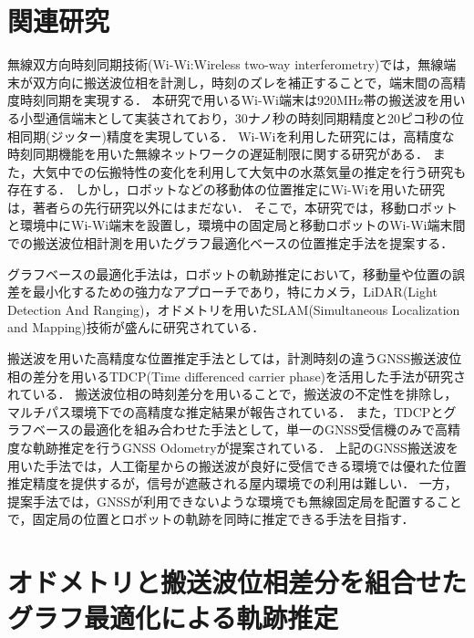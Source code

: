 \documentclass[a4jsme]{jsmepaper}
\begin{document}
\section{関連研究}
無線双方向時刻同期技術(Wi-Wi:Wireless two-way interferometry)では，無線端末が双方向に搬送波位相を計測し，時刻のズレを補正することで，端末間の高精度時刻同期を実現する．
本研究で用いるWi-Wi端末は920MHz帯の搬送波を用いる小型通信端末として実装されており，30ナノ秒の時刻同期精度と20ピコ秒の位相同期(ジッター)精度を実現している\cite{ouchi2024evaluation}．
Wi-Wiを利用した研究には，高精度な時刻同期機能を用いた無線ネットワークの遅延制限に関する研究\cite{Yamasaki2021}がある．
また，大気中での伝搬特性の変化を利用して大気中の水蒸気量の推定を行う研究\cite{Yasuda2019}も存在する．
しかし，ロボットなどの移動体の位置推定にWi-Wiを用いた研究は，著者らの先行研究\cite{rsj2021_nara,rsj2022_nara,ziku2023_nara}以外にはまだない．
そこで，本研究では，移動ロボットと環境中にWi-Wi端末を設置し，環境中の固定局と移動ロボットのWi-Wi端末間での搬送波位相計測を用いたグラフ最適化ベースの位置推定手法を提案する．

グラフベースの最適化手法は，ロボットの軌跡推定において，移動量や位置の誤差を最小化するための強力なアプローチであり，特にカメラ，LiDAR(Light Detection And Ranging)，オドメトリを用いたSLAM(Simultaneous Localization and Mapping)技術が盛んに研究されている\cite{grisetti2010tutorial,graph_slam_urban_mapping,graph_slam_2012}．

搬送波を用いた高精度な位置推定手法としては，計測時刻の違うGNSS搬送波位相の差分を用いるTDCP(Time differenced carrier phase)を活用した手法が研究されている\cite{TDCP2008,TDCP2022}．
搬送波位相の時刻差分を用いることで，搬送波の不定性を排除し，マルチパス環境下での高精度な推定結果が報告されている．
また，TDCPとグラフベースの最適化を組み合わせた手法として，単一のGNSS受信機のみで高精度な軌跡推定を行うGNSS Odometryが提案されている\cite{suzuki2022gnss}．
上記のGNSS搬送波を用いた手法では，人工衛星からの搬送波が良好に受信できる環境では優れた位置推定精度を提供するが，信号が遮蔽される屋内環境での利用は難しい．
一方，提案手法では，GNSSが利用できないような環境でも無線固定局を配置することで，固定局の位置とロボットの軌跡を同時に推定できる手法を目指す．

\newpage

\section{オドメトリと搬送波位相差分を組合せた\\グラフ最適化による軌跡推定}
\end{document}
